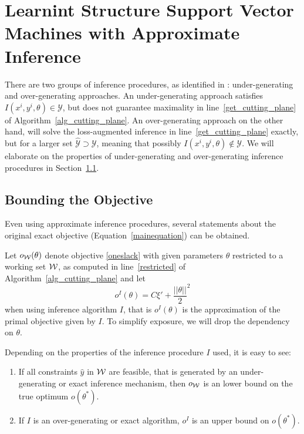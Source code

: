\section{Learnint Structure Support Vector Machines with Approximate Inference}
There are two groups of inference procedures, as identified in
\citet{finley2008training}: under-generating and over-generating approaches.
An under-generating approach satisfies $I(x^i, y^i, \theta) \in
\mathcal{Y}$, but does not guarantee maximality in line~\ref{get_cutting_plane}
of Algorithm~\ref{alg_cutting_plane}. An over-generating approach on the other
hand, will solve the loss-augmented inference in line~\ref{get_cutting_plane}
exactly, but for a larger set $\hat{\mathcal{Y}} \supset \mathcal{Y}$, meaning
that possibly $I(x^i, y^i, \theta) \notin \mathcal{Y}$.  We will elaborate on
the properties of under-generating and over-generating inference procedures in
Section~\ref{bounds}. %

\subsection{Bounding the Objective}\label{bounds}
Even using approximate inference procedures, several statements
about the original exact objective (Equation~\eqref{mainequation}) can be
obtained.

Let $o_{\mathcal{W}}(\theta)$ denote objective \eqref{oneslack} with
given parameters $\theta$ restricted to a working set $\mathcal{W}$, as computed in
line~\ref{restricted} of Algorithm~\ref{alg_cutting_plane} and  let
\[
    o^I(\theta) = C\xi' + \frac{||\theta||}{2}^2
\]
when using inference algorithm $I$, that is $o^I(\theta)$ is the approximation of the primal
objective given by $I$. To simplify exposure, we will drop the dependency on $\theta$.

Depending on the properties of the inference procedure $I$ used, it is easy to see:
\begin{enumerate}
    \item If all constraints $\hat{y}$ in  $\mathcal{W}$ are feasible, that is generated
        by an under-generating or exact inference mechanism, then $o_{\mathcal{W}}$ is
        an lower bound on the true optimum $o(\theta^*)$.

    \item If $I$ is an over-generating or exact algorithm, $o^I$ is an upper
        bound on $o(\theta^*)$.
\end{enumerate}

